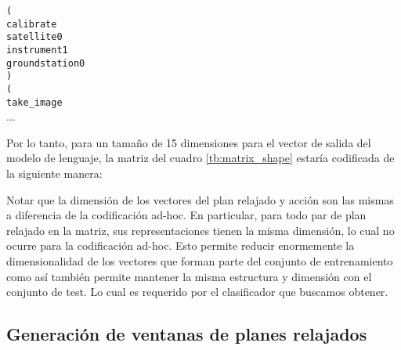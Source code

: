 \begin{center}
\verb|(| \\
\verb|calibrate| \\
\verb|satellite0| \\
\verb|instrument1| \\
\verb|groundstation0| \\
\verb|)| \\
\verb|(| \\
\verb|take_image| \\
...
\end{center}

Por lo tanto, para un tamaño de 15 dimensiones para el vector de salida del
modelo de lenguaje, la matriz del cuadro \ref{tb:matrix_shape} estaría
codificada de la siguiente manera:

\begin{table}[h!]
\centering
{}
 \caption{Ejemplos etiquetados a partir de un plan relajado y una acción}
 \label{tb:matrix_shape}
\end{table}

Notar que la dimensión de los vectores del plan relajado y acción son las mismas
a diferencia de la codificación ad-hoc. En particular, para todo par de plan
relajado en la matriz, sus representaciones tienen la misma dimensión, lo cual
no ocurre para la codificación ad-hoc. Esto permite reducir enormemente la
dimensionalidad de los vectores que forman parte del conjunto de entrenamiento
como así también permite mantener la misma estructura y dimensión con el
conjunto de test. Lo cual es requerido por el clasificador que buscamos obtener.

\subsection{Generación de ventanas de planes relajados}

